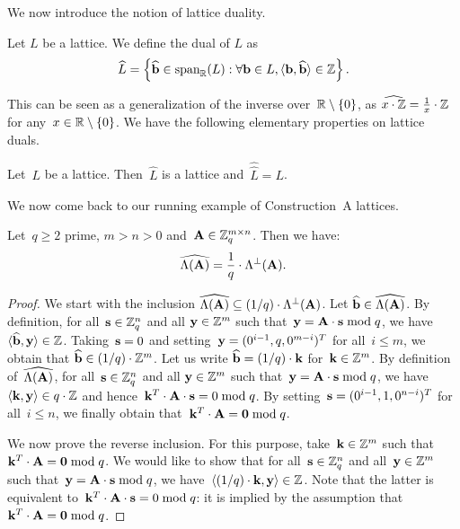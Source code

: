 We now introduce the notion of lattice duality. 

\begin{definition}
\label{def:dual}
Let $L$ be a lattice. We define the dual of $L$ as 
\[
\widehat{L} = \left\{ \widehat{\bf b} \in \mbox{span}_{\mathbb{R}} (L): \forall {\bf b} \in L, \langle{\bf b},\widehat{\bf b}\rangle \in \mathbb{Z} \right\}.
\]
\end{definition}

This can be seen as a generalization of the inverse over~$\mathbb{R} \setminus \{0\}$, as $\widehat{x \cdot \mathbb{Z}} = \frac{1}{x} \cdot \mathbb{Z}$ for any~$x \in \mathbb{R} \setminus \{0\}$. We have the following elementary properties on lattice duals. 

\begin{lemma}
\label{le:dual_props}
Let~$L$ be a lattice. Then~$\widehat{L}$ is a lattice and~$\widehat{\widehat{L}} = L$.
\end{lemma}

We now come back to our running example of Construction~A lattices.

\begin{lemma}
\label{le:constA_dual}
Let~$q\geq 2$ prime, $m>n>0$ and~${\bf A} \in \mathbb{Z}_q^{m \times n}$. Then we have:
\[\widehat{\Lambda({\bf A})} = \frac{1}{q} \cdot \Lambda^\perp({\bf A}).\] 
\end{lemma}

\begin{proof}
We start with the inclusion $\widehat{\Lambda({\bf A})} \subseteq  (1/q) \cdot \Lambda^\perp({\bf A})$. 
Let $\widehat{\bf b} \in \widehat{\Lambda({\bf A})}$. By definition, for 
all~${\bf s} \in \mathbb{Z}_q^n$ and all ${\bf y} \in \mathbb{Z}^m$ such that~${\bf y} = {\bf A}\cdot {\bf s} \bmod q$, 
we have~$\langle\widehat{\bf b},{\bf y}\rangle \in \mathbb{Z}$. Taking~${\bf s}= 0$ and setting~${\bf y} = (0^{i-1},q,0^{m-i})^T$ for all~$i \leq m$, we obtain that $\widehat{\bf b} \in (1/q) \cdot \mathbb{Z}^m$. Let us write $\widehat{\bf b} = (1/q) \cdot {\bf k}$ for~${\bf k} \in \mathbb{Z}^m$. 
By definition of~$\widehat{\Lambda({\bf A})}$, for 
all~${\bf s} \in \mathbb{Z}_q^n$ and all ${\bf y} \in \mathbb{Z}^m$ such that~${\bf y} = {\bf A}\cdot {\bf s} \bmod q$, 
we have~$\langle{\bf k},{\bf y}\rangle \in q \cdot \mathbb{Z}$ and hence~${\bf k}^T \cdot {\bf A} \cdot {\bf s} = 0 \bmod q$. By setting~${\bf s} = (0^{i-1},1,0^{n-i})^T$ for all~$i \leq n$, we finally obtain that~${\bf k}^T \cdot {\bf A}= {\bf 0} \bmod q$.

We now prove the reverse inclusion. For this purpose, take~${\bf k} \in \mathbb{Z}^m$ such that ${\bf k}^T \cdot {\bf A}= {\bf 0} \bmod q$.
We would like to show that for all~${\bf s} \in \mathbb{Z}_q^n$ and all~${\bf y} \in \mathbb{Z}^m$ such that~${\bf y} = {\bf A} \cdot {\bf s} \bmod q$, we have~$\langle(1/q) \cdot {\bf k},{\bf y} \rangle \in \mathbb{Z}$. Note that the latter is equivalent to~${\bf k}^T \cdot {\bf A} \cdot {\bf s} = 0 \bmod q$: it is implied by the assumption that  ${\bf k}^T \cdot {\bf A}= {\bf 0} \bmod q$.
\end{proof}



